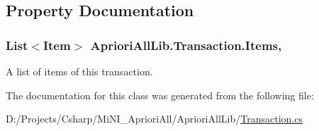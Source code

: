 \subsection{Property Documentation}
\hypertarget{class_apriori_all_lib_1_1_transaction_abb1fe3a28d74f8b1cd5f5ca2add6a043}{
\subsubsection[{Items}]{\setlength{\rightskip}{0pt plus 5cm}List$<${\bf Item}$>$ Apriori\-All\-Lib.\-Transaction.\-Items\hspace{0.3cm}{\ttfamily [get]}, {\ttfamily [set]}}}\label{class_apriori_all_lib_1_1_transaction_abb1fe3a28d74f8b1cd5f5ca2add6a043}


A list of items of this transaction. 



The documentation for this class was generated from the following file\-:\begin{DoxyCompactItemize}
\item 
D\-:/\-Projects/\-Csharp/\-Mi\-N\-I\-\_\-\-Apriori\-All/\-Apriori\-All\-Lib/\hyperlink{_transaction_8cs}{Transaction.\-cs}\end{DoxyCompactItemize}
